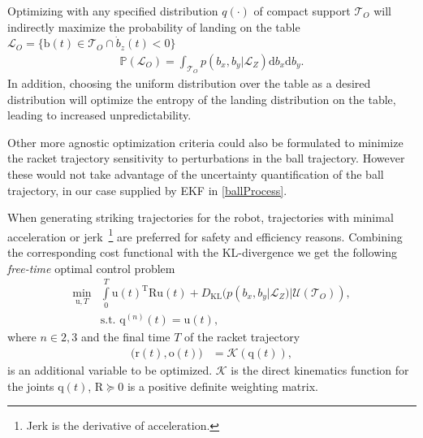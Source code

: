 \documentclass[letterpaper, 10 pt, conference]{ieeeconf}
\newcommand{\boldvec}[1]{\boldsymbol{\mathrm{#1}}}
\let\vec\boldvec
\newcommand{\kin}{\mathcal{K}} %
\newcommand{\joint}{\vec{q}} %
\newcommand{\sysInput}{\vec{u}} %
\newcommand{\ball}{\vec{b}} %
\newcommand{\racket}{\vec{r}} %
\newcommand{\orient}{\vec{o}} %
\newcommand{\courtOpponent}{\mathcal{T}_{O}} %
\newcommand{\court}{\mathcal{T}} %
\newcommand{\prob}{\mathbb{P}} %
\newcommand{\landEvent}{\mathcal{L}} %
\newcommand{\landDist}{p(\tau)} %
\newcommand{\KL}{D_{\mathrm{KL}}}
\begin{document}
Optimizing with any specified distribution $q(\cdot)$ of compact support $\courtOpponent$ will indirectly maximize the probability of landing on the table $\landEvent_{O} = \{\ball(t) \in \court_{O} \cap \dot{b}_z(t) < 0\}$
%
\begin{align}
\prob(\landEvent_{O}) = \int_{\courtOpponent}p(b_x,b_y|\landEvent_{Z})\textrm{d}b_x\textrm{d}b_y.
\end{align}
%
In addition, choosing the uniform distribution over the table as a desired distribution will optimize the entropy of the landing distribution on the table, leading to increased unpredictability. 

Other more agnostic optimization criteria could also be formulated to minimize the racket trajectory sensitivity to perturbations in the ball trajectory. However these would not take advantage of the uncertainty quantification of the ball trajectory, in our case supplied by EKF in \eqref{ballProcess}.

When generating striking trajectories for the robot, trajectories with minimal acceleration or jerk~\footnote{Jerk is the derivative of acceleration.} are preferred for safety and efficiency reasons. Combining the corresponding cost functional with the KL-divergence we get the following \emph{free-time} optimal control problem
%
\begin{align}
\min_{\sysInput,T} & \int\limits_{0}^{T}\sysInput(t)^{\mathrm{T}}\vec{R}\sysInput(t) + \KL(p(b_x,b_y|\landEvent_{Z})|\mathcal{U}(\courtOpponent)), \\
& \textrm{s.t. } \joint^{(n)}(t) = \sysInput(t),
\label{costFnc1}
\end{align}
%
\noindent where $n \in {2,3}$ and the final time $T$ of the racket trajectory 
%
\begin{align}
\big(\racket(t),\orient(t)\big) &= \kin(\joint(t)),
\end{align}
%
\noindent is an additional variable to be optimized. $\kin$ is the direct kinematics function for the joints $\joint(t)$, $\vec{R} \succeq 0$ is a positive definite weighting matrix. 
\end{document}
